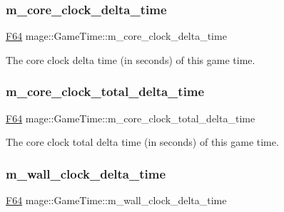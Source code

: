 \subsubsection{\texorpdfstring{m\+\_\+core\+\_\+clock\+\_\+delta\+\_\+time}{m\_core\_clock\_delta\_time}}
{\footnotesize\ttfamily \mbox{\hyperlink{namespacemage_ad26233bbec640deda836e572c1a23708}{F64}} mage\+::\+Game\+Time\+::m\+\_\+core\+\_\+clock\+\_\+delta\+\_\+time\hspace{0.3cm}{\ttfamily [private]}}

The core clock delta time (in seconds) of this game time. \mbox{\label{classmage_1_1_game_time_ad030e0d01cfdfb3080caa74142cd6775}} 
\subsubsection{\texorpdfstring{m\+\_\+core\+\_\+clock\+\_\+total\+\_\+delta\+\_\+time}{m\_core\_clock\_total\_delta\_time}}
{\footnotesize\ttfamily \mbox{\hyperlink{namespacemage_ad26233bbec640deda836e572c1a23708}{F64}} mage\+::\+Game\+Time\+::m\+\_\+core\+\_\+clock\+\_\+total\+\_\+delta\+\_\+time\hspace{0.3cm}{\ttfamily [private]}}

The core clock total delta time (in seconds) of this game time. \mbox{\label{classmage_1_1_game_time_afd4f74b4c930532dbb3b3259cbc068de}} 
\subsubsection{\texorpdfstring{m\+\_\+wall\+\_\+clock\+\_\+delta\+\_\+time}{m\_wall\_clock\_delta\_time}}
{\footnotesize\ttfamily \mbox{\hyperlink{namespacemage_ad26233bbec640deda836e572c1a23708}{F64}} mage\+::\+Game\+Time\+::m\+\_\+wall\+\_\+clock\+\_\+delta\+\_\+time\hspace{0.3cm}{\ttfamily [private]}}


